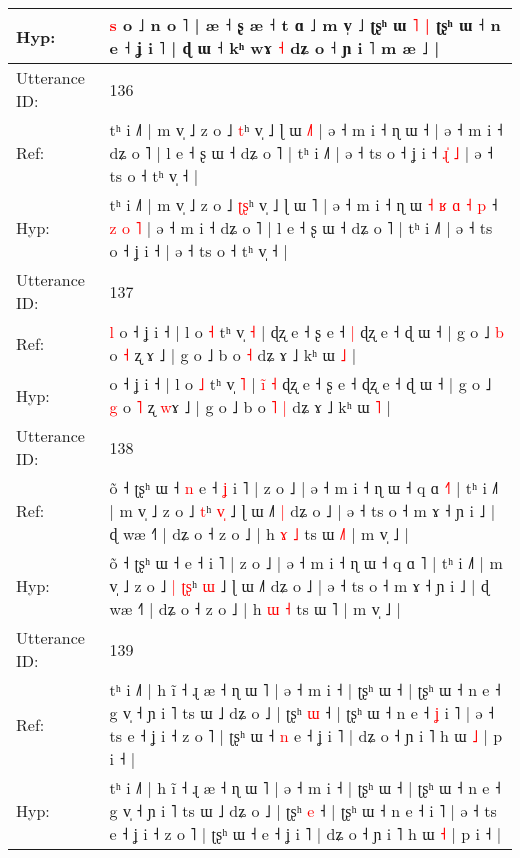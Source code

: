 \documentclass[10pt]{article}
\DeclareRobustCommand{\hl}[1]{{\textcolor{red}{#1}}}
\begin{document}
\begin{longtable}{ll}
Hyp: & \hl{s} o ˩ n o ˥ | æ ˧ ʂ æ ˧ t ɑ ˩ m v̩ ˩\hl{}\hl{} ʈʂʰ ɯ\hl{ }\hl{˥} \hl{|} ʈʂʰ ɯ ˧ n e ˧ ʝ i ˥ | ɖ ɯ ˧ kʰ wɤ\hl{}\hl{} \hl{˧} dʑ o ˧ ɲ i ˥ m æ ˩ |
 \\
\midrule
Utterance ID: & 136 \\
Ref: & tʰ i ˩˥ | m v̩ ˩ z o ˩ \hl{}\hl{t}ʰ v̩ ˩ ɭ ɯ \hl{˩}˥ | ə ˧ m i ˧ ɳ ɯ\hl{}\hl{}\hl{}\hl{}\hl{}\hl{}\hl{}\hl{}\hl{}\hl{} ˧\hl{}\hl{}\hl{}\hl{}\hl{}\hl{} | ə ˧ m i ˧ dʑ o ˥ | l e ˧ ʂ ɯ ˧ dʑ o ˥ | tʰ i ˩˥ | ə ˧ ts o ˧ ʝ i ˧\hl{ }\hl{ɻ}\hl{̍}\hl{ }\hl{˩} | ə ˧ ts o ˧ tʰ v̩ ˧ |
 \\
Hyp: & tʰ i ˩˥ | m v̩ ˩ z o ˩ \hl{ʈ}\hl{ʂ}ʰ v̩ ˩ ɭ ɯ \hl{}˥ | ə ˧ m i ˧ ɳ ɯ\hl{ }\hl{˧}\hl{ }\hl{ʁ}\hl{ }\hl{ɑ}\hl{ }\hl{˧}\hl{ }\hl{p} ˧\hl{ }\hl{z}\hl{ }\hl{o}\hl{ }\hl{˥} | ə ˧ m i ˧ dʑ o ˥ | l e ˧ ʂ ɯ ˧ dʑ o ˥ | tʰ i ˩˥ | ə ˧ ts o ˧ ʝ i ˧\hl{}\hl{}\hl{}\hl{}\hl{} | ə ˧ ts o ˧ tʰ v̩ ˧ |
 \\
\midrule
Utterance ID: & 137 \\
Ref: & \hl{l}\hl{ }o ˧ ʝ i ˧ | l o \hl{˧} tʰ v̩ \hl{˧} |\hl{}\hl{}\hl{}\hl{}\hl{} ɖʐ e ˧ ʂ e ˧\hl{ }\hl{|} ɖʐ e ˧ ɖ ɯ ˧ | g o ˩ \hl{b} o \hl{˧} ʐ \hl{}ɤ ˩ | g o ˩ b o\hl{}\hl{} \hl{˧} dʑ ɤ ˩ kʰ ɯ \hl{˩} |
 \\
Hyp: & \hl{}\hl{}o ˧ ʝ i ˧ | l o \hl{˩} tʰ v̩ \hl{˥} |\hl{ }\hl{i}\hl{̃}\hl{ }\hl{˧} ɖʐ e ˧ ʂ e ˧\hl{}\hl{} ɖʐ e ˧ ɖ ɯ ˧ | g o ˩ \hl{g} o \hl{˥} ʐ \hl{w}ɤ ˩ | g o ˩ b o\hl{ }\hl{˥} \hl{|} dʑ ɤ ˩ kʰ ɯ \hl{˥} |
 \\
\midrule
Utterance ID: & 138 \\
Ref: & õ ˧ ʈʂʰ ɯ ˧\hl{ }\hl{n} e ˧\hl{ }\hl{ʝ} i ˥ | z o ˩ | ə ˧ m i ˧ ɳ ɯ ˧ q ɑ \hl{˧}˥ | tʰ i ˩˥ | m v̩ ˩ z o ˩\hl{}\hl{} \hl{}\hl{t}ʰ \hl{v}\hl{̩} ˩ ɭ ɯ ˩˥\hl{ }\hl{|} dʑ o ˩ | ə ˧ ts o ˧ m ɤ ˧ ɲ i ˩ | ɖ wæ ˧˥ | dʑ o ˧ z o ˩ | h \hl{ɤ} \hl{˩} ts ɯ \hl{˩}˥ | m v̩ ˩ |
 \\
Hyp: & õ ˧ ʈʂʰ ɯ ˧\hl{}\hl{} e ˧\hl{}\hl{} i ˥ | z o ˩ | ə ˧ m i ˧ ɳ ɯ ˧ q ɑ \hl{}˥ | tʰ i ˩˥ | m v̩ ˩ z o ˩\hl{ }\hl{|} \hl{ʈ}\hl{ʂ}ʰ \hl{}\hl{ɯ} ˩ ɭ ɯ ˩˥\hl{}\hl{} dʑ o ˩ | ə ˧ ts o ˧ m ɤ ˧ ɲ i ˩ | ɖ wæ ˧˥ | dʑ o ˧ z o ˩ | h \hl{ɯ} \hl{˧} ts ɯ \hl{}˥ | m v̩ ˩ |
 \\
\midrule
Utterance ID: & 139 \\
Ref: & tʰ i ˩˥ | h ĩ ˧ ɻ æ ˧ ɳ ɯ ˥ | ə ˧ m i ˧ | ʈʂʰ ɯ ˧ | ʈʂʰ ɯ ˧ n e ˧ g v̩ ˧ ɲ i ˥ ts ɯ ˩ dʑ o ˩ | ʈʂʰ \hl{ɯ} ˧ | ʈʂʰ ɯ ˧ n e ˧\hl{ }\hl{ʝ} i ˥ | ə ˧ ts e ˧ ʝ i ˧ z o ˥ | ʈʂʰ ɯ ˧\hl{ }\hl{n} e ˧ ʝ i ˥ | dʑ o ˧ ɲ i ˥ h ɯ \hl{˩} | p i ˧ |
 \\
Hyp: & tʰ i ˩˥ | h ĩ ˧ ɻ æ ˧ ɳ ɯ ˥ | ə ˧ m i ˧ | ʈʂʰ ɯ ˧ | ʈʂʰ ɯ ˧ n e ˧ g v̩ ˧ ɲ i ˥ ts ɯ ˩ dʑ o ˩ | ʈʂʰ \hl{e} ˧ | ʈʂʰ ɯ ˧ n e ˧\hl{}\hl{} i ˥ | ə ˧ ts e ˧ ʝ i ˧ z o ˥ | ʈʂʰ ɯ ˧\hl{}\hl{} e ˧ ʝ i ˥ | dʑ o ˧ ɲ i ˥ h ɯ \hl{˧} | p i ˧ |

\end{longtable}
\end{document}
